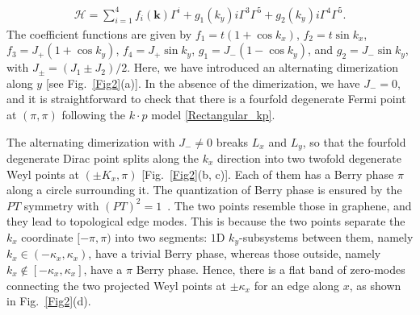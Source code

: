 \documentclass[aps,prl,twocolumn,noshowpacs,superscriptaddress]{revtex4-1}
\def \H {\mathcal{H}}
\def \K {\hat{\mathcal{K}}}
\begin{document}
\begin{equation}\label{hii}
\begin{split}
\H=\sum_{i=1}^4 f_i(\bm{k})\Gamma^i+g_1(k_y)i\Gamma^3\Gamma^5+g_2(k_y)i\Gamma^4\Gamma^5.
\end{split}
\end{equation}
 The coefficient functions are given by $f_1=t(1+\cos k_x)$, $f_2=t\sin k_x$,  $ f_{3}=J_+(1+\cos k_y) $, $ f_{4}=J_+\sin k_y $, $ g_1=J_-(1-\cos k_y) $, and $ g_2=J_-\sin k_y $, with $ J_{\pm}=(J_1\pm J_2)/2 $. Here, we have introduced an alternating dimerization along $y$ [see Fig.~\ref{Fig2}(a)].
In the absence of the dimerization, we have $J_{-}=0$, and it is straightforward to check that there is a fourfold degenerate Fermi point at $(\pi,\pi)$ following the $k\cdot p$ model \eqref{Rectangular_kp}.


The alternating dimerization with $J_-\ne 0$ breaks $L_x$ and $L_y$, so that the fourfold degenerate Dirac point splits along the $ k_x $ direction into two twofold degenerate Weyl points at $ (\pm K_x,\pi) $ [Fig.~\ref{Fig2}(b, c)]. Each of them has a Berry phase $\pi$ along a circle surrounding it. The quantization of Berry phase is ensured by the $PT$ symmetry with $(PT)^2=1$~\cite{SM}. The two points resemble those in graphene, and they lead to topological edge modes. This is because the two points separate the $k_x$ coordinate $[-\pi, \pi)$ into two segments: $1$D $k_y$-subsystems between them, namely $k_x\in (-\kappa_x,\kappa_x)$, have a trivial Berry phase, whereas those outside, namely  $ k_x\notin[-\kappa_x,\kappa_x] $, have a $\pi$ Berry phase. Hence, there is a flat band of zero-modes connecting the two projected Weyl points at $ \pm \kappa_x $ for an edge along $x$, as shown in Fig.~\ref{Fig2}(d).

\end{document}
